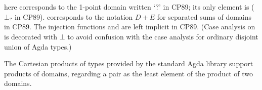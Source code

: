 \begin{AgdaAlign}
\begin{code}
\AgdaSpace{}%
\AgdaSpace{}%
\AgdaSymbol{:}\AgdaSpace{}%
\AgdaSymbol{\}}\AgdaSpace{}%
\<%
\\
\>[17][@{}l@{\AgdaIndent{0}}]%
\>[19]\AgdaSymbol{(}\AgdaSpace{}%
\AgdaSpace{}%
\AgdaSpace{}%
\AgdaSpace{}%
\AgdaSpace{}%
\AgdaSpace{}%
\AgdaSpace{}%
\AgdaSpace{}%
\AgdaSymbol{)}\AgdaSpace{}%
\AgdaSpace{}%
\AgdaSymbol{(}\AgdaSpace{}%
\AgdaSpace{}%
\AgdaSpace{}%
\AgdaSpace{}%
\AgdaSpace{}%
\AgdaSpace{}%
\AgdaSpace{}%
\AgdaSpace{}%
\AgdaSymbol{)}\AgdaSpace{}%
\<%
\\
%
\>[19]\AgdaSpace{}%
\AgdaSpace{}%
\AgdaSpace{}%
\AgdaSpace{}%
\AgdaSpace{}%
\AgdaSpace{}%
\AgdaSpace{}%
\AgdaSpace{}%
\AgdaSpace{}%
\AgdaSymbol{)}\<%
\end{code}
%
 here corresponds to the 1-point domain written `$?$' in CP89;
its only element is  ($⊥_?$ in CP89).
 corresponds to the notation $D + E$ for separated sums of domains in CP89.
The injection functions  and  are left implicit in CP89.
(Case analysis  on  is decorated with $⊥$ to avoid confusion with
the case analysis for ordinary disjoint union of Agda types.)

The Cartesian products of types provided by the standard Agda library support products of domains,
regarding a pair  as the least element of the product of two domains.  


\end{AgdaAlign}
